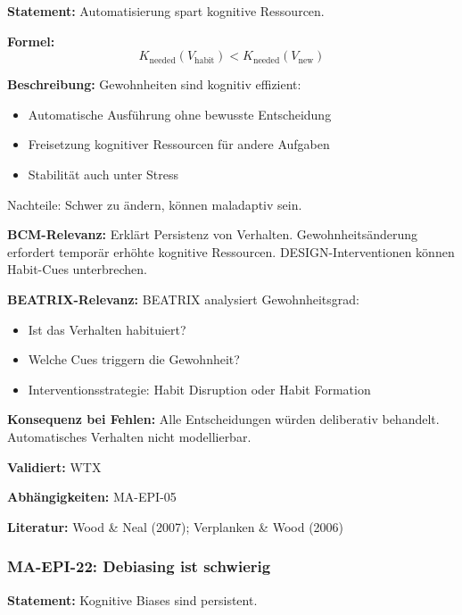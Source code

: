 \textbf{Statement:} Automatisierung spart kognitive Ressourcen.

\textbf{Formel:}
\begin{equation}
K_{\text{needed}}(V_{\text{habit}}) < K_{\text{needed}}(V_{\text{new}})
\end{equation}

\textbf{Beschreibung:}
Gewohnheiten sind kognitiv effizient:
\begin{itemize}
    \item Automatische Ausführung ohne bewusste Entscheidung
    \item Freisetzung kognitiver Ressourcen für andere Aufgaben
    \item Stabilität auch unter Stress
\end{itemize}
Nachteile: Schwer zu ändern, können maladaptiv sein.

\textbf{BCM-Relevanz:}
Erklärt Persistenz von Verhalten. Gewohnheitsänderung erfordert temporär erhöhte kognitive Ressourcen. DESIGN-Interventionen können Habit-Cues unterbrechen.

\textbf{BEATRIX-Relevanz:}
BEATRIX analysiert Gewohnheitsgrad:
\begin{itemize}
    \item Ist das Verhalten habituiert?
    \item Welche Cues triggern die Gewohnheit?
    \item Interventionsstrategie: Habit Disruption oder Habit Formation
\end{itemize}

\textbf{Konsequenz bei Fehlen:}
Alle Entscheidungen würden deliberativ behandelt. Automatisches Verhalten nicht modellierbar.

\textbf{Validiert:} WTX

\textbf{Abhängigkeiten:} MA-EPI-05

\textbf{Literatur:} Wood \& Neal (2007); Verplanken \& Wood (2006)


\subsubsection*{MA-EPI-22: Debiasing ist schwierig}

\textbf{Statement:} Kognitive Biases sind persistent.


